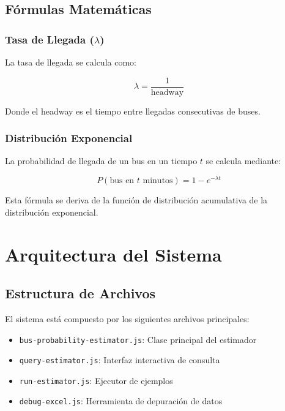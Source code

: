 \documentclass[12pt,a4paper]{article}
\begin{document}
\subsection{Fórmulas Matemáticas}

\subsubsection{Tasa de Llegada ($\lambda$)}

La tasa de llegada se calcula como:

\begin{equation}
\lambda = \frac{1}{\text{headway}}
\end{equation}

Donde el headway es el tiempo entre llegadas consecutivas de buses.

\subsubsection{Distribución Exponencial}

La probabilidad de llegada de un bus en un tiempo $t$ se calcula mediante:

\begin{equation}
P(\text{bus en } t \text{ minutos}) = 1 - e^{-\lambda t}
\end{equation}

Esta fórmula se deriva de la función de distribución acumulativa de la distribución exponencial.

\section{Arquitectura del Sistema}

\subsection{Estructura de Archivos}

El sistema está compuesto por los siguientes archivos principales:

\begin{itemize}
    \item \texttt{bus-probability-estimator.js}: Clase principal del estimador
    \item \texttt{query-estimator.js}: Interfaz interactiva de consulta
    \item \texttt{run-estimator.js}: Ejecutor de ejemplos
    \item \texttt{debug-excel.js}: Herramienta de depuración de datos
\end{itemize}
\end{document}
